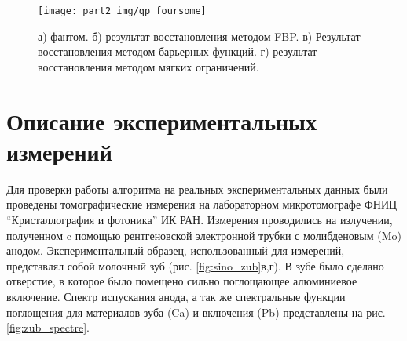 

\begin{figure}
    \centering
    \texttt{[image: part2\_img/qp\_foursome]} \\
    \caption{а) фантом. б) результат восстановления методом FBP. в) Результат восстановления методом барьерных функций. г) результат восстановления методом мягких ограничений.}
    \label{fig:qp_recres_64by64}
\end{figure}

\section{Описание экспериментальных измерений}
Для проверки работы алгоритма на реальных экспериментальных данных были проведены томографические измерения на лабораторном микротомографе ФНИЦ ``Кристаллография и фотоника'' ИК РАН.
Измерения проводились на излучении, полученном c помощью рентгеновской электронной трубки с молибденовым (Mo) анодом.
Экспериментальный образец, использованный для измерений, представлял собой молочный зуб (рис. \ref{fig:sino_zub}в,г).
В зубе было сделано отверстие, в которое было помещено сильно поглощающее алюминиевое включение.
Спектр испускания анода, а так же спектральные функции поглощения для материалов зуба (Ca) и включения (Pb) представлены на рис. \ref{fig:zub_spectre}.

